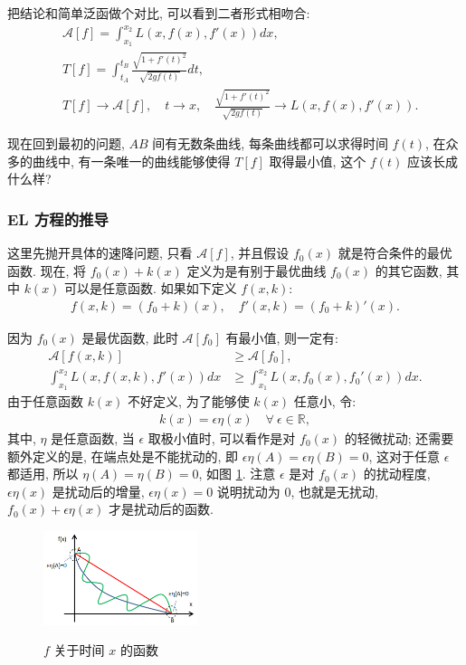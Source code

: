 \documentclass[cn,hazy,blue,14pt,screen]{./cls/elegantnote}
\begin{document}
把结论和简单泛函做个对比, 可以看到二者形式相吻合:
\begin{align*}
 	&\mathcal{A}[f] = \int_{x_1}^{x_2} L(x,f(x),f'(x)) dx, \\
 	&T[f] =  \int_{t_A}^{t_B}\frac{\sqrt{1+f'(t)^2}}{\sqrt{2gf(t)}} dt, \\
 	&T[f]\rightarrow \mathcal{A}[f], \quad t\rightarrow x, \quad \frac{\sqrt{1+f'(t)^2}}{\sqrt{2gf(t)}} \rightarrow L(x,f(x),f'(x)).
\end{align*}

现在回到最初的问题, $ AB $ 间有无数条曲线, 每条曲线都可以求得时间 $ f(t) $, 在众多的曲线中, 有一条唯一的曲线能够使得 $ T[f] $ 取得最小值, 这个 $ f(t) $ 应该长成什么样?

\subsubsection{EL 方程的推导}
这里先抛开具体的速降问题, 只看 $ \mathcal{A}[f] $, 并且假设 $ f_0(x) $ 就是符合条件的最优函数. 现在, 将 $ f_0(x)+k(x) $ 定义为是有别于最优曲线 $ f_0(x) $ 的其它函数, 其中 $ k(x) $ 可以是任意函数. 如果如下定义 $ f(x, k) $:
\begin{align*}
 	f(x,k)=(f_0+k)(x), \quad f'(x,k)=(f_0+k)'(x).
\end{align*}

因为 $ f_0(x) $ 是最优函数, 此时 $ \mathcal{A}[f_0] $ 有最小值, 则一定有:
\begin{align*}
 	\mathcal{A}[f(x,k)] &\geq \mathcal{A}[f_0], \\
 	\int_{x_1}^{x_2}L(x,f(x,k),f'(x))dx &\geq \int_{x_1}^{x_2}L(x,f_0(x),f_0'(x))dx.
\end{align*}
由于任意函数 $ k(x) $ 不好定义, 为了能够使 $ k(x) $ 任意小, 令:
\begin{align*}
 	k(x) = \epsilon \eta(x) \quad \forall \ \epsilon\in\mathbb{R},
\end{align*}
其中, $ \eta $ 是任意函数, 当 $ \epsilon $ 取极小值时, 可以看作是对 $ f_0(x) $ 的轻微扰动; 还需要额外定义的是, 在端点处是不能扰动的, 即 $ \epsilon \eta(A)=\epsilon \eta(B)=0 $, 这对于任意 $ \epsilon $ 都适用, 所以 $  \eta(A)= \eta(B)=0 $, 如图 \ref{fig3}. 注意 $ \epsilon $ 是对 $ f_0(x) $ 的扰动程度, $ \epsilon \eta(x) $ 是扰动后的增量, $ \epsilon \eta(x)=0 $ 说明扰动为 0, 也就是无扰动, $ f_0(x)+\epsilon \eta(x) $ 才是扰动后的函数.
\begin{figure}[!htbp]
	\centering
	\caption{$ f $ 关于时间 $ x $ 的函数}
	\includegraphics[width=0.4\textwidth]{./figures/3.png}
	\label{fig3}
\end{figure}
\end{document}

